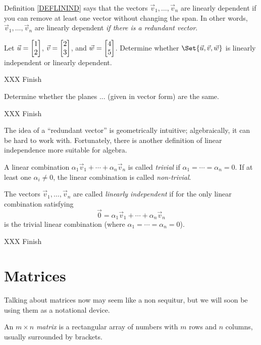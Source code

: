 Definition \ref{DEFLININD} says that the vectors $\vec v_1,\ldots,\vec v_n$ are linearly dependent
if you can remove at least one vector without changing the span. In other words, $\vec v_1,\ldots,\vec v_n$ 
are linearly dependent \emph{if there is a redundant vector}.

\begin{example}
	Let $\vec u=\mat{1\\2}$, $\vec v=\mat{2\\3}$, and $\vec w=\mat{4\\5}$. Determine whether
	$\Set{\vec u,\vec v,\vec w}$ is linearly independent or linearly dependent.

	XXX Finish
\end{example}

\begin{example}
	Determine whether the planes ... (given in vector form) are the same.

	XXX Finish
\end{example}

The idea of a ``redundant vector'' is geometrically intuitive; algebraically, it can be hard
to work with. Fortunately, there is another definition of linear independence more suitable
for algebra.

\begin{definition}
	A linear combination $\alpha_1\vec v_1+\cdots+\alpha_n\vec v_n$ is called
	\emph{trivial}
	if $\alpha_1=\cdots=\alpha_n=0$. If at least one $\alpha_i\neq 0$,
	the linear combination is called \emph{non-trivial}.
\end{definition}

\begin{definition}
	\label{DEFLININDII}
	The vectors $\vec v_1,\ldots,\vec v_n$ are called \emph{linearly independent}
	if for the only linear combination satisfying
	\[
		\vec 0=\alpha_1\vec v_1+\cdots+\alpha_n\vec v_n
	\]
	is the trivial linear combination (where $\alpha_1=\cdots=\alpha_n=0$).
\end{definition}

XXX Finish

\section{Matrices}
	Talking about matrices now may seem like a non sequitur, but we will soon be
	using them as a notational device.
	\begin{definition}[Matrix]
		An $m\times n$ \emph{matrix} is a rectangular
		array of numbers with $m$ rows and $n$ columns, usually surrounded by
		brackets.
	\end{definition}

